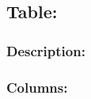 \documentclass[letterpaper,10pt,english]{sphinxmanual}
\begin{document}
\subsection{Table: }
\label{\detokenize{schema_documentation:table-main}}

\subsubsection{Description:}
\label{\detokenize{schema_documentation:id7}}

\subsubsection{Columns:}
\label{\detokenize{schema_documentation:id8}}
\end{document}
